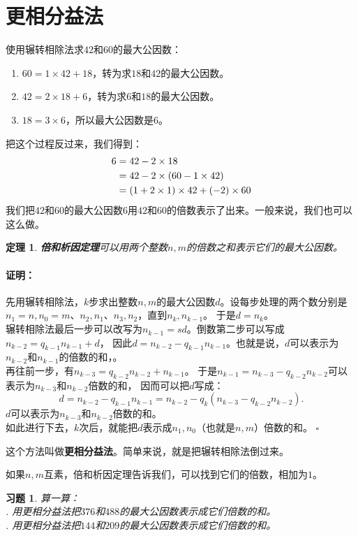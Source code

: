 \documentclass[12pt,UTF8]{ctexbook}
\newtheorem{tm}{定理}[section]
\newenvironment{proof2}{\paragraph{\textbf{证明：}}}{\hfill$\square$}
\newtheorem{xt}{习题}[section]
\begin{document}
\section{更相分益法}
使用辗转相除法求$42$和$60$的最大公因数：
\begin{enumerate}
    \item $60 = 1 \times 42 + 18$，转为求$18$和$42$的最大公因数。
    \item $42 = 2 \times 18 + 6$，转为求$6$和$18$的最大公因数。
    \item $18 = 3 \times 6$，所以最大公因数是$6$。
\end{enumerate}
把这个过程反过来，我们得到：
\begin{align}
    6 &= 42 - 2 \times 18 \notag \\
    &= 42 - 2 \times (60 - 1 \times 42) \notag \\
    &= (1 + 2\times 1) \times 42 + (-2) \times 60 \notag 
\end{align}
我们把$42$和$60$的最大公因数$6$用$42$和$60$的倍数表示了出来。一般来说，我们也可以这么做。
\begin{tm}{\textbf{倍和析因定理}}\label{tm:5-1-0}
    可以用两个整数$n,m$的倍数之和表示它们的最大公因数。
\end{tm}
\begin{proof2}
    先用辗转相除法，$k$步求出整数$n,m$的最大公因数$d$。设每步处理的两个数分别是$n_1=n,n_0=m$、$n_2, n_1$、$n_3, n_2$，直到$n_k, n_{k-1}$。
    于是$d = n_k$。\\
    辗转相除法最后一步可以改写为$n_{k-1} = sd $。倒数第二步可以写成$n_{k-2} = q_{k-1}n_{k-1} + d$，
    因此$d = n_{k-2} -q_{k-1}n_{k-1}$。也就是说，$d$可以表示为$n_{k-2}$和$n_{k-1}$的倍数的和，。\\
    再往前一步，有$n_{k-3} = q_{k-2}n_{k-2} + n_{k-1}$。
    于是$n_{k-1} = n_{k-3} - q_{k-2}n_{k-2}$可以表示为$n_{k-3}$和$n_{k-2}$倍数的和，
    因而可以把$d$写成：
    $$d = n_{k-2} - q_{k-1}n_{k-1} = n_{k-2} - q_k(n_{k-3} - q_{k-2}n_{k-2}).$$
    $d$可以表示为$n_{k-3}$和$n_{k-2}$倍数的和。\\
    如此进行下去，$k$次后，就能把$d$表示成$n_1,n_0$（也就是$n,m$）倍数的和。
\end{proof2}

这个方法叫做\textbf{更相分益法}。简单来说，就是把辗转相除法倒过来。

如果$n,m$互素，倍和析因定理告诉我们，可以找到它们的倍数，相加为$1$。

\begin{xt}\label{xt:5-1-1}
    算一算：\\
    . 用更相分益法把$376$和$488$的最大公因数表示成它们倍数的和。\\
    . 用更相分益法把$144$和$209$的最大公因数表示成它们倍数的和。
\end{xt}
\end{document}
